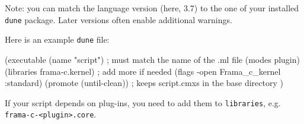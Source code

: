 Note: you can match the language version (here, 3.7) to the one of your
installed \texttt{dune} package. Later versions often enable additional
warnings.

Here is an example \texttt{dune} file:
\begin{dunecode}
(executable
  (name "script") ; must match the name of the .ml file
  (modes plugin)
  (libraries frama-c.kernel) ; add more if needed
  (flags -open Frama_c_kernel :standard)
  (promote (until-clean)) ; keeps script.cmxs in the base directory
)
\end{dunecode}

If your script depends on \FramaC plug-ins, you need to add them to
\texttt{libraries}, e.g. \texttt{frama-c-<plugin>.core}.
